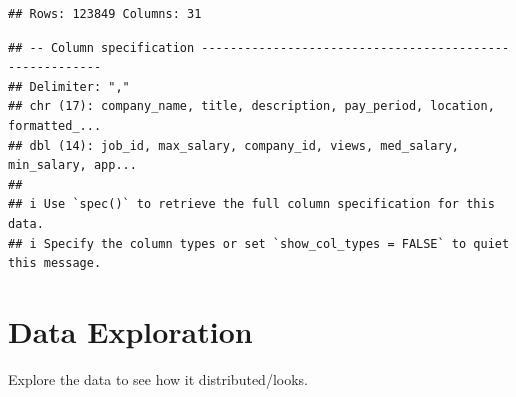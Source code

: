 \documentclass[
]{article}
\begin{document}
\begin{verbatim}
## Rows: 123849 Columns: 31
\end{verbatim}

\begin{verbatim}
## -- Column specification --------------------------------------------------------
## Delimiter: ","
## chr (17): company_name, title, description, pay_period, location, formatted_...
## dbl (14): job_id, max_salary, company_id, views, med_salary, min_salary, app...
## 
## i Use `spec()` to retrieve the full column specification for this data.
## i Specify the column types or set `show_col_types = FALSE` to quiet this message.
\end{verbatim}

\section{Data Exploration}\label{data-exploration}

Explore the data to see how it distributed/looks.
\end{document}

